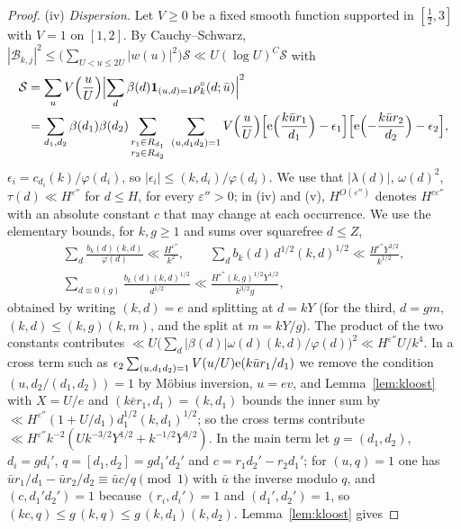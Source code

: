 \documentclass[11pt,a4paper]{article}
\theoremstyle{remark}\newtheorem{remark}[theorem]{Remark}
\begin{document}
\begin{proof}
(iv) \emph{Dispersion.} Let $V\ge0$ be a fixed smooth function supported in $[\tfrac12,3]$ with $V=1$ on $[1,2]$. By Cauchy--Schwarz,
$|\mathcal B_{k,j}|^2\le\bigl(\sum_{U<u\le2U}|w(u)|^2\bigr)\mathcal S\ll U(\log U)^C\mathcal S$ with
\[
\begin{aligned}
\mathcal S&=\sum_uV\Bigl(\frac uU\Bigr)\Bigl|\sum_d\beta(d)\mathbf 1_{(u,d)=1}\rho^\circ_k(d;\bar u)\Bigr|^2\\
&=\sum_{d_1,d_2}\beta(d_1)\beta(d_2)\sum_{\substack{r_1\in R_{d_1}\\ r_2\in R_{d_2}}}\ \sum_{(u,d_1d_2)=1}V\Bigl(\frac uU\Bigr)
\Bigl[\mathrm{e}\Bigl(\frac{k\bar ur_1}{d_1}\Bigr)-\epsilon_1\Bigr]\Bigl[\mathrm{e}\Bigl(-\frac{k\bar ur_2}{d_2}\Bigr)-\epsilon_2\Bigr],
\end{aligned}
\]
$\epsilon_i=c_{d_i}(k)/\varphi(d_i)$, so $|\epsilon_i|\le(k,d_i)/\varphi(d_i)$. We use that $|\lambda(d)|$, $\omega(d)^2$, $\tau(d)\ll H^{\varepsilon''}$ for $d\le H$,
for every $\varepsilon''>0$; in (iv) and (v), $H^{O(\varepsilon'')}$ denotes $H^{c\varepsilon''}$ with an absolute constant $c$ that may change at each occurrence. We use the elementary bounds, for $k,g\ge1$ and sums over squarefree $d\le Z$,
\[
\begin{gathered}
\sum_d\frac{b_k(d)(k,d)}{\varphi(d)}\ll\frac{H^{\varepsilon''}}{k^2},\qquad
\sum_db_k(d)\,d^{1/2}(k,d)^{1/2}\ll\frac{H^{\varepsilon''}Y^{3/2}}{k^{1/2}},\\
\sum_{d\equiv0\,(g)}\frac{b_k(d)(k,d)^{1/2}}{d^{1/2}}\ll\frac{H^{\varepsilon''}(k,g)^{1/2}Y^{1/2}}{k^{3/2}g},
\end{gathered}
\]
obtained by writing $(k,d)=e$ and splitting at $d=kY$ (for the third, $d=gm$, $(k,d)\le(k,g)(k,m)$, and the split at $m=kY/g$).
The product of the two constants contributes $\ll U\bigl(\sum_d|\beta(d)|\omega(d)(k,d)/\varphi(d)\bigr)^2\ll H^{\varepsilon''}U/k^4$. In a cross
term such as $\epsilon_2\sum_{(u,d_1d_2)=1}V(u/U)\mathrm{e}(k\bar ur_1/d_1)$ we remove the condition $(u,d_2/(d_1,d_2))=1$ by M\"obius inversion,
$u=ev$, and Lemma~\ref{lem:kloost} with $X=U/e$ and $(k\bar er_1,d_1)=(k,d_1)$ bounds the inner sum by
$\ll H^{\varepsilon''}(1+U/d_1)d_1^{1/2}(k,d_1)^{1/2}$; so the cross terms contribute
$\ll H^{\varepsilon''}k^{-2}(Uk^{-3/2}Y^{1/2}+k^{-1/2}Y^{3/2})$. In the main term let $g=(d_1,d_2)$, $d_i=gd_i'$, $q=[d_1,d_2]=gd_1'd_2'$ and
$c=r_1d_2'-r_2d_1'$; for $(u,q)=1$ one has $\bar ur_1/d_1-\bar ur_2/d_2\equiv\bar uc/q\pmod1$ with $\bar u$ the inverse modulo $q$, and
$(c,d_1'd_2')=1$ because $(r_i,d_i')=1$ and $(d_1',d_2')=1$, so $(kc,q)\le g\,(k,q)\le g\,(k,d_1)(k,d_2)$. Lemma~\ref{lem:kloost} gives

\end{proof}
\end{document}
